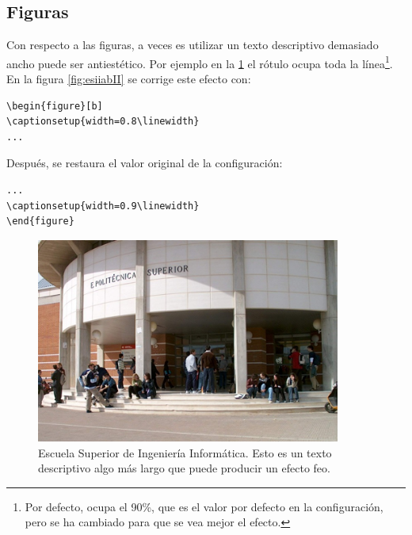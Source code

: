 \subsection{Figuras}

Con respecto a las figuras, a veces es utilizar un texto descriptivo demasiado ancho puede ser antiestético. Por ejemplo en la \ref{fig:esiiabI} el rótulo ocupa toda la línea\footnote{Por defecto, ocupa el 90\%, que es el valor por defecto en la configuración, pero se ha cambiado para que se vea mejor el efecto.}. En la figura \ref{fig:esiiabII} se corrige este efecto con:

\begin{verbatim}
\begin{figure}[b] 
\captionsetup{width=0.8\linewidth}
...
\end{verbatim}

Después, se restaura el valor original de la configuración:
\begin{verbatim}
...
\captionsetup{width=0.9\linewidth}
\end{figure}
\end{verbatim}


\begin{figure}[p] 
\captionsetup{width=1\linewidth}
\begin{center}
\includegraphics[width=10cm]{figs/esiiab.png}
\end{center}
\caption[Escuela Superior de Ingeniería Informática I]{Escuela Superior de Ingeniería Informática. Esto es un texto descriptivo algo más largo que puede producir un efecto feo.}
\label{fig:esiiabI}
\end{figure}



